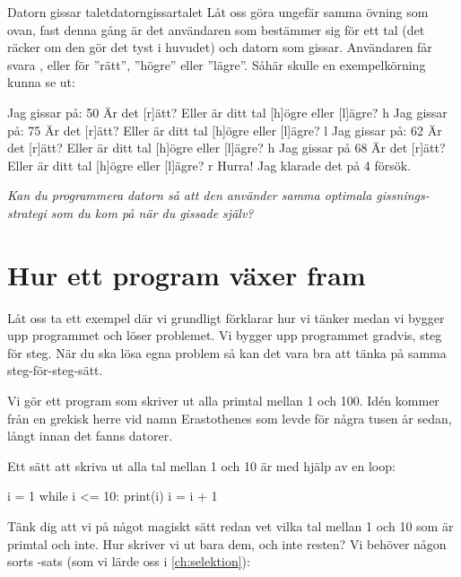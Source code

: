 \begin{matteovningm}{Datorn gissar talet}{datorngissartalet}
Låt oss göra ungefär samma övning som ovan, fast denna gång är det användaren som bestämmer sig för ett tal (det räcker om den gör det tyst i huvudet) och datorn som gissar. Användaren får svara ,  eller  för ''rätt'', ''högre'' eller ''lägre''. Såhär skulle en exempelkörning kunna se ut:

\vspace{10pt}
\begin{python}
Jag gissar på: 50
Är det [r]ätt? Eller är ditt tal [h]ögre eller [l]ägre? h
Jag gissar på: 75
Är det [r]ätt? Eller är ditt tal [h]ögre eller [l]ägre? l
Jag gissar på: 62
Är det [r]ätt? Eller är ditt tal [h]ögre eller [l]ägre? h
Jag gissar på 68
Är det [r]ätt? Eller är ditt tal [h]ögre eller [l]ägre? r
Hurra! Jag klarade det på 4 försök.
\end{python}

\emph{Kan du programmera datorn så att den använder samma optimala gissnings-strategi som du kom på när du gissade själv?}
\end{matteovningm}


\section{Hur ett program växer fram}

Låt oss ta ett exempel där vi grundligt förklarar hur vi tänker medan vi bygger upp programmet och löser problemet. Vi bygger upp programmet gradvis, steg för steg. När du ska lösa egna problem så kan det vara bra att tänka på samma steg-för-steg-sätt.

Vi gör ett program som skriver ut alla primtal mellan 1 och 100. Idén kommer från en grekisk herre vid namn Erastothenes som levde för några tusen år sedan, långt innan det fanns datorer.

Ett sätt att skriva ut alla tal mellan 1 och 10 är med hjälp av en loop:
\vspace{10pt}
\begin{python}
i = 1
while i <= 10:
	print(i)
	i = i + 1
\end{python}

Tänk dig att vi på något magiskt sätt redan vet vilka tal mellan 1 och 10 som är primtal och inte. Hur skriver vi ut bara dem, och inte resten? Vi behöver någon sorts -sats (som vi lärde oss i \autoref{ch:selektion}):

